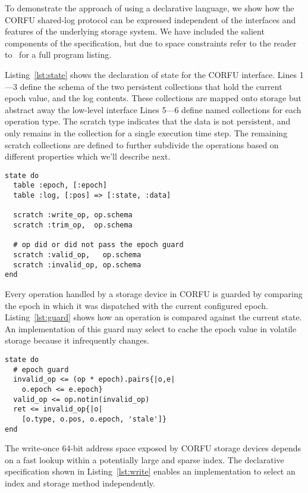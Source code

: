 To demonstrate the approach of using a declarative language, we show how the
CORFU shared-log protocol can be expressed independent of the interfaces and
features of the underlying storage system. We have included the salient
components of the specification, but due to space constraints refer to the
reader to~\cite{tr} for a full program listing.

Listing~\ref{lst:state} shows the declaration of state for the CORFU
interface.  Lines 1---3 define the schema of the two persistent collections
that hold the current epoch value, and the log contents. These collections are
mapped onto storage but abstract away the low-level interface Lines 5---6
define named collections for each operation type. The scratch type indicates
that the data is not persistent, and only remains in the collection for a
single execution time step. The remaining scratch collections are defined to
further subdivide the operations based on different properties which we'll
describe next.

\begin{lstlisting}[caption={State Declaration}, label=lst:state]
state do
  table :epoch, [:epoch]
  table :log, [:pos] => [:state, :data]

  scratch :write_op, op.schema
  scratch :trim_op,  op.schema

  # op did or did not pass the epoch guard
  scratch :valid_op,   op.schema
  scratch :invalid_op, op.schema
end
\end{lstlisting}

Every operation handled by a storage device in CORFU is guarded by comparing
the epoch in which it was dispatched with the current configured epoch.
Listing~\ref{lst:guard} shows how an operation is compared against the current
state. An implementation of this guard may select to cache the epoch value in
volatile storage because it infrequently changes.

\begin{lstlisting}[caption={Epoch Guard}, label=lst:guard]
state do
  # epoch guard
  invalid_op <= (op * epoch).pairs{|o,e|
    o.epoch <= e.epoch}
  valid_op <= op.notin(invalid_op)
  ret <= invalid_op{|o|
    [o.type, o.pos, o.epoch, 'stale']}
end
\end{lstlisting}

The write-once 64-bit address space exposed by CORFU storage devices depends
on a fast lookup within a potentially large and sparse index. The declarative
specification shown in Listing~\ref{lst:write} enables an implementation to
select an index and storage method independently.

